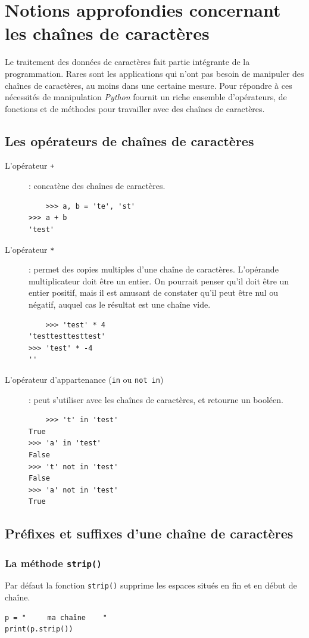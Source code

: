 \documentclass[a4paper,12pt]{book}
\begin{document}
\chapter{Notions approfondies concernant les chaînes de caractères}
Le traitement des données de caractères fait partie intégrante de la programmation. Rares sont les applications qui n'ont pas besoin de manipuler des chaînes de caractères, au moins dans une certaine mesure. Pour répondre à ces nécessités de manipulation \textit{Python} fournit un riche ensemble d'opérateurs, de fonctions et de méthodes pour travailler avec des chaînes de caractères. 

\section{Les opérateurs de chaînes de caractères}
\begin{description}
	\item[L'opérateur \texttt{+}]: concatène des chaînes de caractères.
	\begin{verbatim}
	>>> a, b = 'te', 'st'
>>> a + b
'test'
	\end{verbatim}
	\item[L'opérateur \texttt{*}]: permet des copies multiples d'une chaîne de caractères. L'opérande multiplicateur doit être un entier. On pourrait penser qu'il doit être un entier positif, mais il est amusant de constater qu'il peut être nul ou négatif, auquel cas le résultat est une chaîne vide.
	\begin{verbatim}
	>>> 'test' * 4
'testtesttesttest'
>>> 'test' * -4
''
	\end{verbatim}
	\item[L'opérateur d'appartenance (\texttt{in} ou \texttt{not in})]: peut s'utiliser avec les chaînes de caractères, et retourne un booléen.
	\begin{verbatim}
	>>> 't' in 'test'
True
>>> 'a' in 'test'
False
>>> 't' not in 'test'
False
>>> 'a' not in 'test'
True
	\end{verbatim}
\end{description}
\medskip

\section{Préfixes et suffixes d'une chaîne de caractères}
\subsection*{La méthode \texttt{strip()}}
Par défaut la fonction \texttt{strip()} supprime les espaces situés en fin et en début de chaîne.
\begin{lstlisting}
p = "     ma chaîne    "
print(p.strip())
\end{lstlisting}
\medskip
\end{document}
